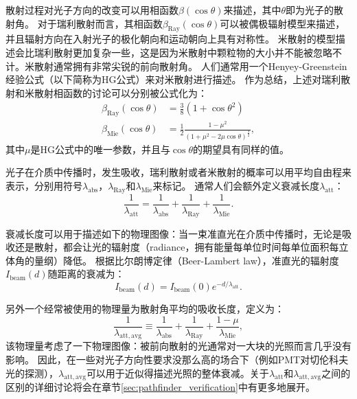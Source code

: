 散射过程对光子方向的改变可以用相函数$\beta(\cos\theta)$来描述，其中$\theta$即为光子的散射角。
对于瑞利散射而言，其相函数$\beta_\mathrm{Ray} (\cos\theta)$可以被偶极辐射模型来描述，并且辐射方向在入射光子的极化朝向和运动朝向上具有对称性。
米散射的模型描述会比瑞利散射更加复杂一些，这是因为米散射中颗粒物的大小并不能被忽略不计。米散射通常拥有非常尖锐的前向散射角。
人们通常用一个Henyey-Greenstein经验公式（以下简称为HG公式）\cite{Henyey_Greenstein:1941}来对米散射进行描述。
作为总结，上述对瑞利散射和米散射相函数的讨论可以分别被公式化为：
\begin{subequations}
    \label{eq:phase_function}
    \begin{align}
        \beta_\mathrm{Ray}(\cos\theta) &= \frac{3}{8} \left( 1 + \cos{\theta}^2 \right) \label{eq:pathfinder_phase_ray}  \\
        \beta_\mathrm{Mie}(\cos\theta) &= \frac{1}{2} \frac{1 - \mu^2}{(1 + \mu^2 - 2 \mu \cos{\theta}) ^{\frac{3}{2}}} , \label{eq:pathfinder_phase_mie}
    \end{align}
\end{subequations}
其中$\mu$是HG公式中的唯一参数，并且与$\cos\theta$的期望具有同样的值。

光子在介质中传播时，发生吸收，瑞利散射或者米散射的概率可以用平均自由程来表示，分别用符号$\lambda_\mathrm{abs}$，$\lambda_\mathrm{Ray}$和$\lambda_\mathrm{Mie}$来标记。
通常人们会额外定义衰减长度$\lambda_\mathrm{att}$：
\begin{equation}
    \frac{1}{\lambda_\mathrm{att}} = \frac{1}{\lambda_\mathrm{abs}} + \frac{1}{\lambda_\mathrm{Ray}} + \frac{1}{\lambda_\mathrm{Mie}} .
    \label{eq:pathfinder_attenuation}
\end{equation}

衰减长度可以用于描述如下的物理图像：当一束准直光在介质中传播时，无论是吸收还是散射，都会让光的辐射度（radiance，拥有能量每单位时间每单位面积每立体角的量纲）降低。
根据比尔朗博定律（Beer-Lambert law）\cite{Beer_Lambert_law:2020}，准直光的辐射度$I_\mathrm{beam}(d)$随距离的衰减为：
\begin{equation}
    I_\mathrm{beam}(d) = I_\mathrm{beam}(0) e^{-d / \lambda_\mathrm{att}} .
    \label{eq:pathfinder_Beer_Lambert}
\end{equation}

另外一个经常被使用的物理量为散射角平均的吸收长度，定义为：
\begin{equation}
    \frac{1}{\lambda_\mathrm{att,avg}} \equiv \frac{1}{\lambda_\mathrm{abs}} + \frac{1}{\lambda_\mathrm{Ray}} + \frac{1 - \mu}{\lambda_\mathrm{Mie}} ,
    \label{eq:pathfinder_att_avg}
\end{equation}
该物理量考虑了一下物理图像：被前向散射的光通常对一大块的光照而言几乎没有影响。
因此，在一些对光子方向性要求没那么高的场合下（例如PMT对切伦科夫光的探测），$\lambda_\mathrm{att,avg}$可以用于近似得描述光照的整体衰减。关于$\lambda_ \mathrm{att}$和$\lambda_ \mathrm{att,avg}$之间的区别的详细讨论将会在章节\ref{sec:pathfinder_verification}中有更多地展开。

